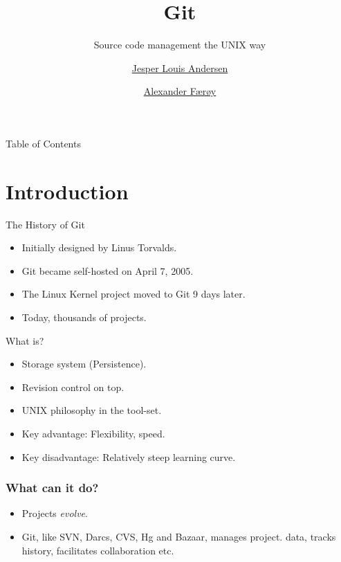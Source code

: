 \documentclass[xcolor=pdftex,dvipsnames]{beamer}
\title{Git}
\subtitle{Source code management the UNIX way}
\author{\href{mailto:jesper.louis.andersen@gmail.com}{Jesper Louis Andersen}
        \and
        \href{mailto:ahf@0x90.dk}{Alexander Færøy}}
\begin{document}
\frame{\titlepage}

\begin{frame}{Table of Contents}
    \tableofcontents
\end{frame}

\section{Introduction}
\begin{frame}{The History of Git}
    \begin{itemize}
        \item Initially designed by Linus Torvalds.
        \item Git became self-hosted on April 7, 2005.
        \item The Linux Kernel project moved to Git 9 days later.
        \item Today, thousands of projects.
    \end{itemize}
\end{frame}
\begin{frame}{What is?}
  \begin{itemize}
  \item Storage system (Persistence).
  \item Revision control on top.
  \item UNIX philosophy in the tool-set.
  \item Key advantage: Flexibility, speed.
  \item Key disadvantage: Relatively steep learning curve.
  \end{itemize}
\end{frame}
\begin{frame}
  \frametitle{What can it do?}
  \begin{itemize}
  \item Projects \emph{evolve}.
  \item Git, like SVN, Darcs, CVS, Hg and Bazaar, manages project.
    data, tracks history, facilitates collaboration etc.
  \end{itemize}
\end{frame}
\end{document}
